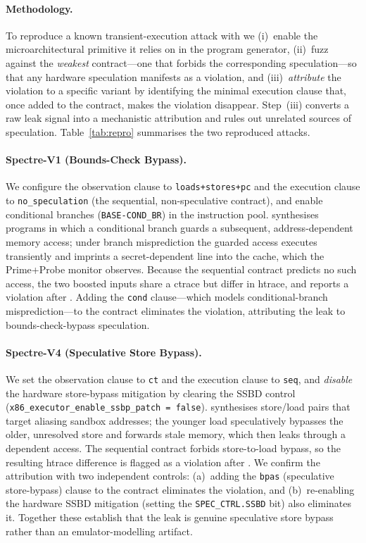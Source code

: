 \paragraph{Methodology.}
To reproduce a known transient-execution attack with \tool we
(i)~enable the microarchitectural primitive it relies on in the program
generator, (ii)~fuzz against the \emph{weakest} contract---one that
forbids the corresponding speculation---so that any hardware
speculation manifests as a violation, and (iii)~\emph{attribute} the
violation to a specific variant by identifying the minimal execution
clause that, once added to the contract, makes the violation disappear.
Step~(iii) converts a raw leak signal into a mechanistic attribution and
rules out unrelated sources of speculation. Table~\ref{tab:repro}
summarises the two reproduced attacks.

\paragraph{Spectre-V1 (Bounds-Check Bypass).}
We configure the observation clause to \texttt{loads+stores+pc} and the
execution clause to \texttt{no\_speculation} (the sequential, non-speculative
contract), and enable conditional branches (\texttt{BASE-COND\_BR}) in the
instruction pool. \tool synthesises programs in which a conditional branch
guards a subsequent, address-dependent memory access; under branch
misprediction the guarded access executes transiently and imprints a
secret-dependent line into the cache, which the Prime+Probe monitor
observes. Because the sequential contract predicts no such access, the two
boosted inputs share a ctrace but differ in htrace, and \tool reports a
violation after .
Adding the \texttt{cond} clause---which models conditional-branch
misprediction---to the contract eliminates the violation, attributing the
leak to bounds-check-bypass speculation.

\paragraph{Spectre-V4 (Speculative Store Bypass).}
We set the observation clause to \texttt{ct} and the execution clause to
\texttt{seq}, and \emph{disable} the hardware store-bypass mitigation by
clearing the SSBD control (\texttt{x86\_executor\_enable\_ssbp\_patch =
false}). \tool synthesises store/load pairs that target aliasing sandbox
addresses; the younger load speculatively bypasses the older, unresolved
store and forwards stale memory, which then leaks through a dependent
access. The sequential contract forbids store-to-load bypass, so the
resulting htrace difference is flagged as a violation after
. We confirm the
attribution with two independent controls: (a)~adding the \texttt{bpas}
(speculative store-bypass) clause to the contract eliminates the
violation, and (b)~re-enabling the hardware SSBD mitigation
(setting the \texttt{SPEC\_CTRL.SSBD} bit) also eliminates it. Together
these establish that the leak is genuine speculative store bypass rather
than an emulator-modelling artifact.

